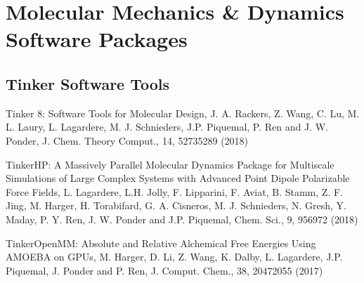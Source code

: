 \documentclass[letterpaper,11pt,english]{sphinxmanual}
\begin{document}
\section{Molecular Mechanics \& Dynamics Software Packages}
\label{\detokenize{text/references:molecular-mechanics-dynamics-software-packages}}

\subsection{Tinker Software Tools}
\label{\detokenize{text/references:tinker-software-tools}}

Tinker 8: Software Tools for Molecular Design, J. A. Rackers, Z. Wang, C. Lu, M. L. Laury, L. Lagardere, M. J. Schnieders, J.\sphinxhyphen{}P. Piquemal, P. Ren and J. W. Ponder, J. Chem. Theory Comput., 14, 5273\sphinxhyphen{}5289 (2018)


Tinker\sphinxhyphen{}HP: A Massively Parallel Molecular Dynamics Package for Multiscale Simulations of Large Complex Systems with Advanced Point Dipole Polarizable Force Fields, L. Lagardere, L.\sphinxhyphen{}H. Jolly, F. Lipparini, F. Aviat, B. Stamm, Z. F. Jing, M. Harger, H. Torabifard, G. A. Cisneros, M. J. Schnieders, N. Gresh, Y. Maday, P. Y. Ren, J. W. Ponder and J.\sphinxhyphen{}P. Piquemal, Chem. Sci., 9, 956\sphinxhyphen{}972 (2018)


Tinker\sphinxhyphen{}OpenMM: Absolute and Relative Alchemical Free Energies Using AMOEBA on GPUs, M. Harger, D. Li, Z. Wang, K. Dalby, L. Lagardere, J.\sphinxhyphen{}P. Piquemal, J. Ponder and P. Ren, J. Comput. Chem., 38, 2047\sphinxhyphen{}2055 (2017)
\end{document}
